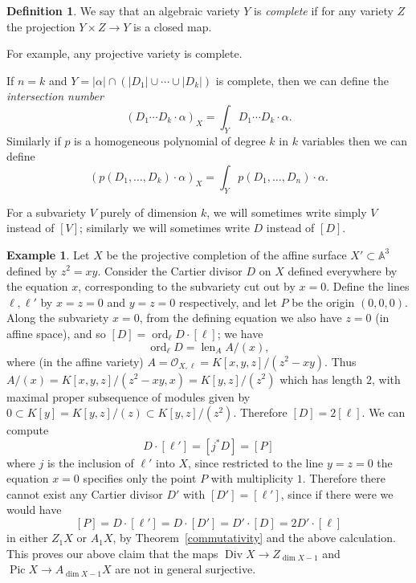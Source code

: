 \documentclass[leqno, openany]{memoir}
\theoremstyle{definition}
\newtheorem{defn}[thm]{Definition}
\newtheorem{exm}[thm]{Example}
\theoremstyle{remark}
\theoremstyle{plain}
\theoremstyle{definition}
\theoremstyle{remark}
\newcommand{\A}{\mathbb{A}}
\newcommand{\mc}[1]{\mathcal{#1}}
\DeclareMathOperator{\Pic}{Pic}
\DeclareMathOperator{\ord}{ord}
\DeclareMathOperator{\Div}{Div}
\begin{document}
\begin{defn}
We say that an algebraic variety $Y$ is \textit{complete}  if for any variety $Z$ the projection $Y \times Z \to Y$ is a closed map.
\end{defn}
For example, any projective variety is complete.

If $n = k$ and $Y = |\alpha| \cap (|D_1| \cup \cdots \cup |D_k|)$ is complete, then we can define the \textit{intersection number} \[ (D_1 \cdots D_k \cdot \alpha)_X = \int_Y D_1 \cdots D_k \cdot \alpha . \] Similarly if $p$ is a homogeneous polynomial of degree $k$ in $k$ variables then we can define \[ (p(D_1, \ldots, D_k) \cdot \alpha)_X = \int_Y p(D_1, \ldots, D_n) \cdot \alpha . \]

For a subvariety $V$ purely of dimension $k$, we will sometimes write simply $V$ instead of $[V]$; similarly we will sometimes write $D$ instead of $[D]$.

\begin{exm}
    Let $X$ be the projective completion of the affine surface $X' \subset \A^3$ defined by $z^2 = xy$. Consider the Cartier divisor $D$ on $X$ defined everywhere by the equation $x$, corresponding to the subvariety cut out by $x = 0$. Define the lines $\ell, \ell'$ by $x = z = 0$ and $y = z = 0$ respectively, and let $P$ be the origin $(0,0,0)$. Along the subvariety $x = 0$, from the defining equation we also have $z = 0$ (in affine space), and so $[D] = \ord_\ell D \cdot [\ell]$; we have \[ \ord_\ell D = \operatorname{len}_A A/(x) , \] where (in the affine variety) $A = \mc{O}_{X,\ell} = K[x,y,z]/(z^2 - x y)$. Thus $A/(x) = K[x,y,z]/(z^2-xy,x) = K[y,z]/(z^2)$ which has length $2$, with maximal proper subsequence of modules given by $0 \subset K[y] = K[y,z]/(z) \subset K[y,z]/(z^2)$. Therefore $[D] = 2 [\ell]$.  We can compute \[ D \cdot [\ell'] = [j^* D] = [P] \] where $j$ is the inclusion of $\ell'$ into $X$, since restricted to the line $y = z = 0$ the equation $x=0$ specifies only the point $P$ with multiplicity $1$. Therefore there cannot exist any Cartier divisor $D'$ with $[D'] = [\ell']$, since if there were we would have \[ [P] = D \cdot [\ell'] = D \cdot [D'] = D' \cdot [D] = 2 D' \cdot [\ell] \] in either $Z_1 X$ or $A_1 X$, by Theorem~\ref{commutativity} and the above calculation. This proves our above claim that the maps $\Div X \to Z_{\dim X - 1}$ and $\Pic X \to A_{\dim X - 1} X$ are not in general surjective.
\end{exm}
\end{document}
